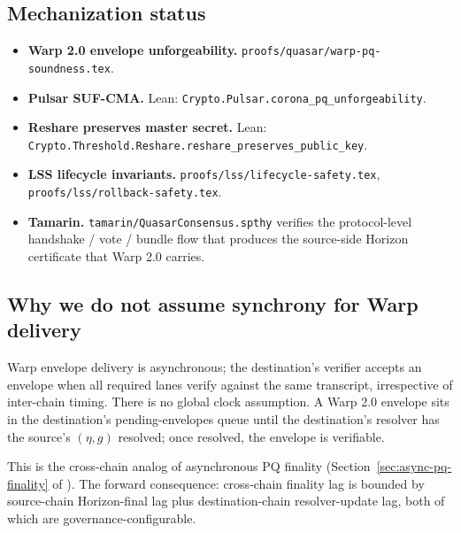 \subsection{Mechanization status}

\begin{itemize}[leftmargin=2em,nosep]
  \item \textbf{Warp 2.0 envelope unforgeability.} \texttt{proofs/quasar/warp-pq-soundness.tex}.
  \item \textbf{Pulsar SUF-CMA.} Lean: \texttt{Crypto.Pulsar.corona\_pq\_unforgeability}.
  \item \textbf{Reshare preserves master secret.} Lean: \texttt{Crypto.Threshold.Reshare.reshare\_preserves\_public\_key}.
  \item \textbf{LSS lifecycle invariants.} \texttt{proofs/lss/lifecycle-safety.tex}, \texttt{proofs/lss/rollback-safety.tex}.
  \item \textbf{Tamarin.} \texttt{tamarin/QuasarConsensus.spthy} verifies the protocol-level handshake / vote / bundle flow that produces the source-side Horizon certificate that Warp 2.0 carries.
\end{itemize}

\subsection{Why we do not assume synchrony for Warp delivery}

Warp envelope delivery is asynchronous; the destination's verifier accepts an envelope when all required lanes verify against the same transcript, irrespective of inter-chain timing. There is no global clock assumption. A Warp 2.0 envelope sits in the destination's pending-envelopes queue until the destination's resolver has the source's $(\eta, g)$ resolved; once resolved, the envelope is verifiable.

This is the cross-chain analog of asynchronous PQ finality (Section~\ref{sec:async-pq-finality} of \cite{luxquasarhorizon}). The forward consequence: cross-chain finality lag is bounded by source-chain Horizon-final lag plus destination-chain resolver-update lag, both of which are governance-configurable.
